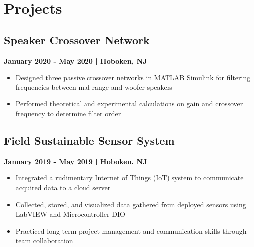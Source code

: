 \documentclass[a4paper, 11pt]{article}
\newenvironment{tightemize}{
\vspace{-\topsep}\begin{itemize}[leftmargin=1em]\itemsep1pt \parskip0pt \parsep0pt}
{\end{itemize}\vspace{-\topsep}}
\begin{document}
\hfill
\begin{minipage}[h]{0.63\textwidth}
\fontsize{10}{0}\selectfont
\vspace{1em}
\section{Projects}
\subsection{Speaker Crossover Network\\}
\hspace{-6pt}\vspace{0.8em}\textbf{\textcolor{location}{January 2020 - May 2020 | Hoboken, NJ}}\\
\begin{tightemize}
\item{\textcolor{location}{Designed three passive crossover networks in MATLAB Simulink for filtering frequencies between mid-range and woofer speakers}}
\item{\textcolor{location}{Performed theoretical and experimental calculations on gain and crossover frequency to determine filter order}}
\end{tightemize}
\vspace{-1em}
\subsection{Field Sustainable Sensor System\\} 
\hspace{-6pt}\vspace{0.8em}\textbf{\textcolor{location}{January 2019 - May 2019 | Hoboken, NJ}}\\
\vspace{-0.5em}
\begin{tightemize}
\fontsize{10}{0}\selectfont
\item{\textcolor{location}{Integrated a rudimentary Internet of Things (IoT) system to communicate acquired data to a cloud server}}
\item{\textcolor{location}{Collected, stored, and visualized data gathered from deployed sensors using LabVIEW and Microcontroller DIO}}
\item{\textcolor{location}{Practiced long-term project management and communication skills through team collaboration}}
\end{tightemize}
\vspace{-1em}

\end{minipage}
\end{document}
